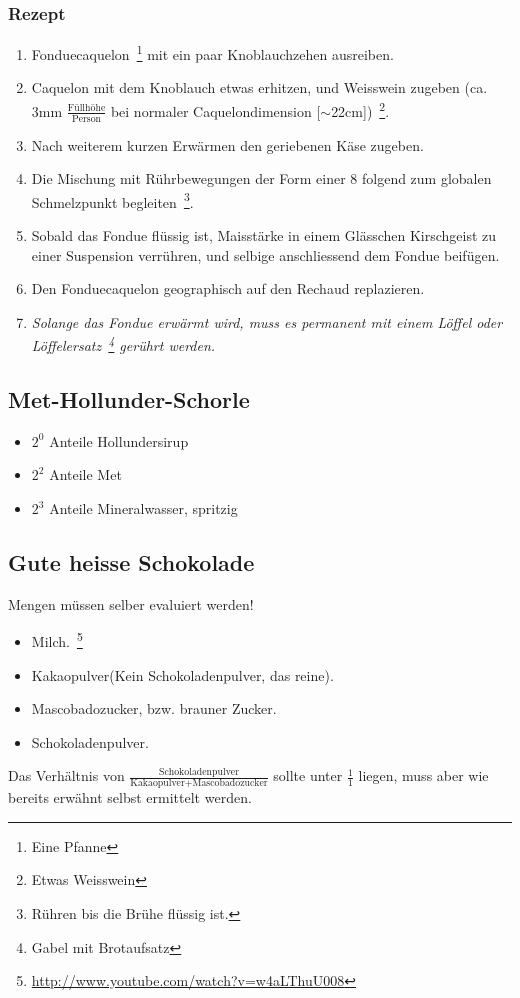 \documentclass[oneside,12pt,a4paper]{scrartcl}
\begin{document}
\subsubsection{Rezept}

\begin{enumerate}
\item Fonduecaquelon~\footnote{Eine Pfanne} mit ein paar Knoblauchzehen ausreiben.
\item Caquelon mit dem Knoblauch etwas erhitzen, und Weisswein zugeben (ca. 3mm $\frac {\mbox{Füllhöhe}} {\mbox{Person}}$ bei normaler Caquelondimension [$\sim$22cm])~\footnote{Etwas Weisswein}.
\item Nach weiterem kurzen Erwärmen den geriebenen Käse zugeben.
\item Die Mischung mit Rührbewegungen der Form einer 8 folgend zum globalen Schmelzpunkt begleiten~\footnote{Rühren bis die Brühe flüssig ist.}.
\item Sobald das Fondue flüssig ist, Maisstärke in einem Glässchen Kirschgeist zu einer Suspension verrühren, und selbige anschliessend dem Fondue beifügen.
\item Den Fonduecaquelon geographisch auf den Rechaud replazieren.
\item \emph{Solange das Fondue erwärmt wird, muss es permanent mit einem Löffel oder Löffelersatz~\footnote{Gabel mit Brotaufsatz} gerührt werden.} 
\end{enumerate}

\subsection{Met-Hollunder-Schorle}
\begin{itemize}
\item $2^{0}$ Anteile Hollundersirup
\item $2^{2}$ Anteile Met
\item $2^{3}$ Anteile Mineralwasser, spritzig
\end{itemize}
\subsection{Gute heisse Schokolade}
\label{sec:hot_chocolate}
Mengen müssen selber evaluiert werden!
\begin{itemize}
	\item Milch.~\footnote{\url{http://www.youtube.com/watch?v=w4aLThuU008}}
	\item Kakaopulver(Kein Schokoladenpulver, das reine).
	\item Mascobadozucker, bzw. brauner Zucker.
	\item Schokoladenpulver.
\end{itemize}
Das Verhältnis von $\frac{\mbox{Schokoladenpulver}}{\mbox{Kakaopulver}+\mbox{Mascobadozucker}}$ sollte unter $\frac{1}{1}$ liegen, muss aber wie bereits erwähnt selbst ermittelt werden.
\end{document}
